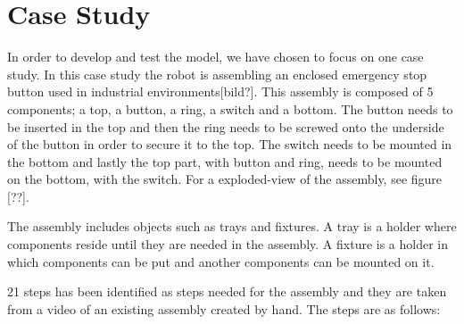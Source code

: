\chapter{Case Study}\label{cha:assembly}
In order to develop and test the model, we have chosen to focus on one case study. In this case study the robot is assembling an enclosed emergency stop button used in industrial environments[bild?]. This assembly is composed of 5 components; a top, a button, a ring, a switch and a bottom. The button needs to be inserted in the top and then the ring needs to be screwed onto the underside of the button in order to secure it to the top. The switch needs to be mounted in the bottom and lastly the top part, with button and ring, needs to be mounted on the bottom, with the switch. For a exploded-view of the assembly, see figure [??].

The assembly includes objects such as trays and fixtures. A tray is a holder where components reside until they are needed in the assembly. A fixture is a holder in which components can be put and another components can be mounted on it.

21 steps has been identified as steps needed for the assembly and they are taken from a video of an existing assembly created by hand. The steps are as follows:

